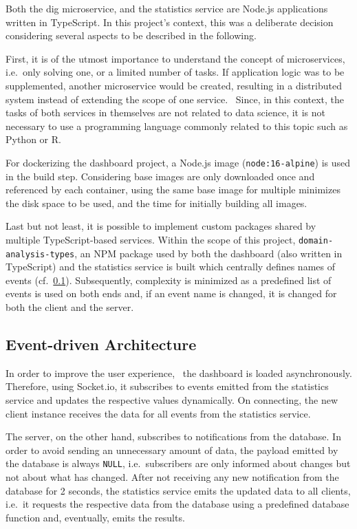 Both the dig microservice, and the statistics service are Node.js applications written in TypeScript.
In this project's context, this was a deliberate decision considering several aspects to be described in the following.

First, it is of the utmost importance to understand the concept of microservices, i.e.\ only solving one, or a limited number of tasks.
If application logic was to be supplemented, another microservice would be created, resulting in a distributed system instead of extending the scope of one service.~\autocite[cf.][p. 23]{Farcic.2016}
Since, in this context, the tasks of both services in themselves are not related to data science, it is not necessary to use a programming language commonly related to this topic such as Python or R.~\autocite[cf.][]{Gossett.2021}

For dockerizing the dashboard project, a Node.js image (\texttt{node:16-alpine}) is used in the build step.
Considering base images are only downloaded once and referenced by each container, using the same base image for multiple minimizes the disk space to be used, and the time for initially building all images.~\autocite[cf.][pp. 8-9]{Arundel.2019}

Last but not least, it is possible to implement custom packages shared by multiple TypeScript-based services.
Within the scope of this project, \texttt{domain-analysis-types}, an NPM package used by both the dashboard (also written in TypeScript) and the statistics service is built which centrally defines names of events (cf.~\ref{subsec:event-driven-architecture}).
Subsequently, complexity is minimized as a predefined list of events is used on both ends and, if an event name is changed, it is changed for both the client and the server.

\subsection{Event-driven Architecture}\label{subsec:event-driven-architecture}

In order to improve the user experience,~\autocite[cf.][]{Shah.2021} the dashboard is loaded asynchronously.
Therefore, using Socket.io, it subscribes to events emitted from the statistics service and updates the respective values dynamically.
On connecting, the new client instance receives the data for all events from the statistics service.

The server, on the other hand, subscribes to notifications from the database.
In order to avoid sending an unnecessary amount of data, the payload emitted by the database is always \texttt{NULL}, i.e.\ subscribers are only informed about changes but not about what has changed.
After not receiving any new notification from the database for 2 seconds, the statistics service emits the updated data to all clients, i.e.\ it requests the respective data from the database using a predefined database function and, eventually, emits the results.

